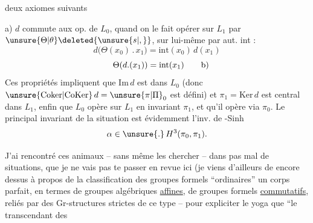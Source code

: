 deux axiomes suivants

a) $d$ commute aux op. de $L_0$, quand on le fait opérer sur $L_1$ par $\unsure{\Theta|\theta}\deleted{\unsure{s|,}}$, sur lui-même par aut. int :
\[
d\bigl(\Theta(x_0)\mathbin{.}x_1\bigr)=\mathrm{int}(x_0)\,d(x_1)
\]
\[
\Theta(d.(x_1))=\mathrm{int}(x_1)\tag*{\makebox[0pt][r]{\makebox[\displaywidth][l]{b)}}}
\]
Ces propriétés impliquent que $\mathrm{Im}\,d$ est  dans $L_0$ (donc $\unsure{\mathrm{Coker}|\mathrm{CoKer}}\,d=\unsure{\pi|\Pi}_0$ est défini) et $\pi_1=\mathrm{Ker}\,d$ est central dans $L_1$, enfin que $L_0$ opère sur $L_1$ en invariant $\pi_1$, et qu'il opère via $\pi_0$. Le principal invariant  de la situation est évidemment l'inv. de -Sinh
\[
\alpha\in\unsure{.}\,H^3(\pi_0,\pi_1).
\]

J'ai rencontré ces animaux -- sans même les chercher -- dans pas mal de situations, que je ne vais pas te passer en revue ici (je viens d'ailleurs de  encore dessus à propos de la classification des groupes formels ``ordinaires''  un corps parfait, en termes de groupes algébriques \uline{affines}, de groupes formels \uline{commutatifs}, reliés par des Gr-structures strictes de ce type%
 -- pour expliciter le yoga que ``le  transcendant des
